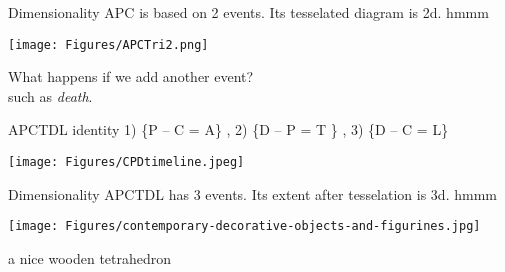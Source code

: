 \documentclass[20pt]{beamer}
\begin{document}

\begin{frame}[plain]
\begin{block}{Dimensionality}
APC is based on 2 events. Its tesselated diagram is 2d. hmmm
\end{block}
\begin{center}
\texttt{[image: Figures/APCTri2.png]}
\end{center}
\end{frame}


\begin{frame}[plain]
\begin{center}
\Large What happens if we add another event?\\ \vspace{1em}
such as \emph{death}.
\end{center}
\end{frame}


\begin{frame}[plain]
\begin{block}{APCTDL identity}
1) \{P -- C = A\}  ,  2) \{D -- P = T  \} , 3) \{D -- C = L\}
\end{block}
\begin{center}
\texttt{[image: Figures/CPDtimeline.jpeg]}
\end{center}
\end{frame}


\begin{frame}[plain]
\begin{center}
\end{center}
\end{frame}


\begin{frame}[plain]
\begin{block}{Dimensionality}
APCTDL has 3 events. Its extent after tesselation is 3d. hmmm
\end{block}
\vspace{1em}
\begin{center}
\texttt{[image: Figures/contemporary-decorative-objects-and-figurines.jpg]}

a nice wooden tetrahedron
\end{center}
\end{frame}
\end{document}
